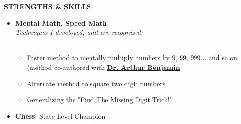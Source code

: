 \documentclass[a4paper,8pt]{article}
\newcommand{\isep}{-2 pt}
\newcommand{\resheading}[1]{\begin{tcolorbox} \begin{center} #1 \end{center} \end{tcolorbox}}
\begin{document}
\resheading{\textbf{STRENGTHS \& SKILLS} }
\begin{itemize}[noitemsep]

\item \textbf{Mental Math, Speed Math}\\
 \emph{Techniques I developed, and are recognized:} \\[-0.6cm]\\
	\begin{itemize}\itemsep \isep
	\item Faster method to mentally multiply numbers by 9, 99, 999... and so on (method co-authored with \href{https://www.ted.com/talks/arthur_benjamin_does_mathemagic}{\textbf{Dr. Arthur Benjamin}}
	\item Alternate method to square two digit numbers.
	\item Generalizing the "Find The Missing Digit Trick!"

	\end{itemize}

\end{itemize}

\begin{itemize}
\item \noindent \textbf{Chess}: State Level Champion
\end{itemize}

\end{document}

